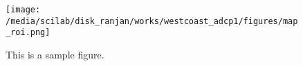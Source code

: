 \documentclass{article}
\begin{document}
	
	\lipsum[1] %
	
	\begin{figure}[htbp] %
		\centering
		\texttt{[image: /media/scilab/disk\_ranjan/works/westcoast\_adcp1/figures/map\_roi.png]} %
		\caption{This is a sample figure.}
		\label{fig:sample}
	\end{figure}
	
	\lipsum[2] %
	
\end{document}

